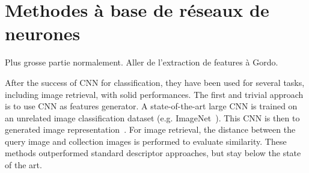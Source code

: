 \section{Methodes à base de réseaux de neurones}

Plus grosse partie normalement.
Aller de l'extraction de features à Gordo.

After the success of CNN for classification, they have been used for several tasks, including image retrieval, with solid performances. 
The first and trivial approach is to use CNN as features generator. A state-of-the-art large CNN is trained on an unrelated image classification dataset (e.g. ImageNet~\cite{deng2009imagenet}).
This CNN is then to generated image representation~\cite{sharif2014cnn, babenko2014neural}. For image retrieval, the distance between the query image and collection images is performed to evaluate similarity.
These methods outperformed standard descriptor approaches, but stay below the state of the art. 